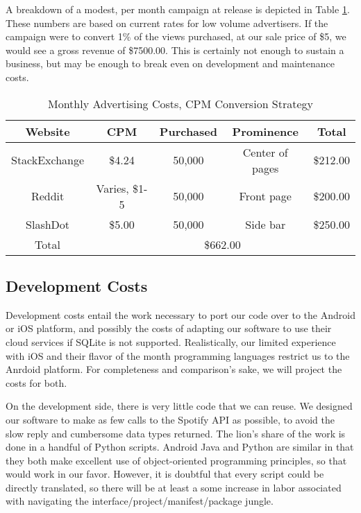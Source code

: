 \documentclass{roffin}
\begin{document}
A breakdown of a modest, per month campaign at release is depicted in Table \ref{adverts}.  These numbers are based on current rates for low volume advertisers.  If the campaign were to convert 1\% of the views purchased, at our sale price of \$5, we would see a gross revenue of \$7500.00.  This is certainly not enough to sustain a business, but may be enough to break even on development and maintenance costs.

\begin{table}[]
\centering
\caption{Monthly Advertising Costs, CPM Conversion Strategy}
\label{adverts}
\begin{tabular}{|c|c|c|c|c|}
\hline
Website       & CPM           & Purchased       & Prominence           & Total \\ \hline
StackExchange & \$4.24        & 50,000          & Center of pages      & \$212.00    \\ \hline
Reddit        & Varies, \$1-5 & 50,000          & Front page           & \$200.00    \\ \hline
SlashDot      & \$5.00        & 50,000          & Side bar             & \$250.00    \\ \hline
Total         &  \multicolumn{4}{c|}{\$662.00} \\ \hline
\end{tabular}
\end{table}

\subsection{Development Costs}
Development costs entail the work necessary to port our code over to the Android or iOS platform, and possibly the costs of adapting our software to use their cloud services if SQLite is not supported.  Realistically, our limited experience with iOS and their flavor of the month programming languages restrict us to the Anrdoid platform.  For completeness and comparison's sake, we will project the costs for both.

On the development side, there is very little code that we can reuse.  We designed our software to make as few calls to the Spotify API as possible, to avoid the slow reply and cumbersome data types returned.  The lion's share of the work is done in a handful of Python scripts.  Android Java and Python are similar in that they both make excellent use of object-oriented programming principles, so that would work in our favor.  However, it is doubtful that every script could be directly translated, so there will be at least a some increase in labor associated with navigating the interface/project/manifest/package jungle.
\end{document}
